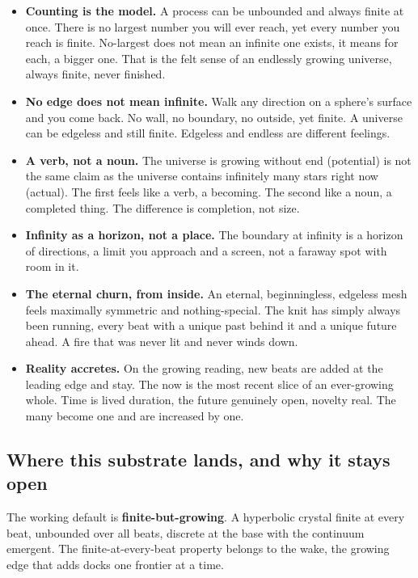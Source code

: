 \begin{itemize}
\item \textbf{Counting is the model.} A process can be unbounded and always finite at once. There is no largest number you will ever reach, yet every number you reach is finite. No-largest does not mean an infinite one exists, it means for each, a bigger one. That is the felt sense of an endlessly growing universe, always finite, never finished.
\item \textbf{No edge does not mean infinite.} Walk any direction on a sphere's surface and you come back. No wall, no boundary, no outside, yet finite. A universe can be edgeless and still finite. Edgeless and endless are different feelings.
\item \textbf{A verb, not a noun.} The universe is growing without end (potential) is not the same claim as the universe contains infinitely many stars right now (actual). The first feels like a verb, a becoming. The second like a noun, a completed thing. The difference is completion, not size.
\item \textbf{Infinity as a horizon, not a place.} The boundary at infinity is a horizon of directions, a limit you approach and a screen, not a faraway spot with room in it.
\item \textbf{The eternal churn, from inside.} An eternal, beginningless, edgeless mesh feels maximally symmetric and nothing-special. The knit has simply always been running, every beat with a unique past behind it and a unique future ahead. A fire that was never lit and never winds down.
\item \textbf{Reality accretes.} On the growing reading, new beats are added at the leading edge and stay. The now is the most recent slice of an ever-growing whole. Time is lived duration, the future genuinely open, novelty real. The many become one and are increased by one.
\end{itemize}

\subsection{Where this substrate lands, and why it stays open}

The working default is \textbf{finite-but-growing}. A hyperbolic crystal finite at every beat, unbounded over all beats, discrete at the base with the continuum emergent. The finite-at-every-beat property belongs to the wake, the growing edge that adds docks one frontier at a time.

